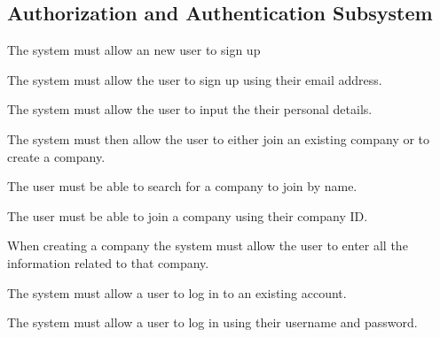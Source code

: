 \documentclass{article}
\begin{document}
	\subsection*{Authorization and Authentication Subsystem}	
	\begin{list}{R.}{}
		\item The system must allow an new user to sign up
		\begin{list}{R.}{}
			\item The system must allow the user to sign up using their email address.
			\item The system must allow the user to input the their personal details.
			\item The system must then allow the user to either join an existing company or to create a company.
			\begin{list}{R..}{}
				\item The user must be able to search for a company to join by name.
				\item The user must be able to join a company using their company ID.
			\end{list} 
			\item When creating a company the system must allow the user to enter all the information related to that company.
		\end{list}
		\item The system must allow a user to log in to an existing account.
		\begin{list}{R.}{}
			\item The system must allow a user to log in using their username and password.
		\end{list}
	\end{list}
	
\end{document}
